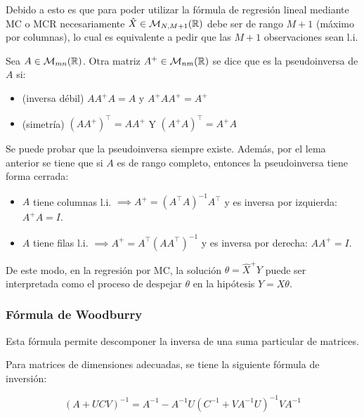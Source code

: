 Debido a esto es que para poder utilizar la fórmula de regresión lineal mediante MC o MCR necesariamente $\hat{X} \in\mathcal{M}_{N,M+1}(\mathbb{R})$ debe ser de rango $M+1$ (máximo por columnas), lo cual es equivalente a pedir que las $M+1$ observaciones sean l.i.\\

\begin{definition} Sea $A\in\mathcal{M}_{mn}(\mathbb{R})$. Otra matriz $A^+\in\mathcal{M}_{nm}(\mathbb{R})$ se dice que es la pseudoinversa de $A$ si:

\begin{itemize}
	\item (inversa débil) $AA^+A=A$ y $A^+AA^+=A^+$
	\item (simetría) $(AA^+)^\top  = AA^+$ Y $(A^+A)^\top  = A^+A$
\end{itemize}
	
\end{definition}

Se puede probar que la pseudoinversa siempre existe. Además, por el lema anterior se tiene que si $A$ es de rango completo, entonces la pseudoinversa tiene forma cerrada:

\begin{itemize}
	\item $A$ tiene columnas l.i. $\implies A^+=(A^\top A)^{-1}A^\top $ y es inversa por izquierda: $A^+A=I$.
	\item $A$ tiene filas l.i. $\implies A^+=A^\top (AA^\top )^{-1}$ y es inversa por derecha: $AA^+=I$.
\end{itemize}

De este modo, en la regresión por MC, la solución $\theta=\hat{X}^+Y$ puede ser interpretada como el proceso de despejar $\theta$ en la hipótesis $Y=X\theta$.

\subsubsection{Fórmula de Woodburry}

Esta fórmula permite descomponer la inversa de una suma particular de matrices.

\begin{theorem}
	Para matrices de dimensiones adecuadas, se tiene la siguiente fórmula de inversión:
	
	\begin{equation}
		(A+UCV)^{-1} = A^{-1} - A^{-1}U(C^{-1}+VA^{-1}U)^{-1}VA^{-1}
	\end{equation}
\end{theorem}

